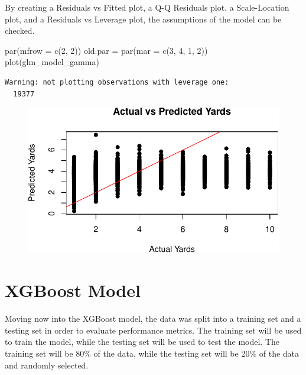 \documentclass[
  super,
  preprint,
  3p]{elsarticle}
\newenvironment{Shaded}{\begin{snugshade}}{\end{snugshade}}
\newcommand{\AttributeTok}[1]{\textcolor[rgb]{0.40,0.45,0.13}{#1}}
\newcommand{\DecValTok}[1]{\textcolor[rgb]{0.68,0.00,0.00}{#1}}
\newcommand{\FunctionTok}[1]{\textcolor[rgb]{0.28,0.35,0.67}{#1}}
\newcommand{\NormalTok}[1]{\textcolor[rgb]{0.00,0.23,0.31}{#1}}
\newcommand{\OtherTok}[1]{\textcolor[rgb]{0.00,0.23,0.31}{#1}}
\begin{document}
By creating a Residuals vs Fitted plot, a Q-Q Residuals plot, a
Scale-Location plot, and a Residuals vs Leverage plot, the assumptions
of the model can be checked.

\begin{Shaded}
\begin{Highlighting}[]
\FunctionTok{par}\NormalTok{(}\AttributeTok{mfrow =} \FunctionTok{c}\NormalTok{(}\DecValTok{2}\NormalTok{, }\DecValTok{2}\NormalTok{))}
\NormalTok{old.par }\OtherTok{=} \FunctionTok{par}\NormalTok{(}\AttributeTok{mar =} \FunctionTok{c}\NormalTok{(}\DecValTok{3}\NormalTok{, }\DecValTok{4}\NormalTok{, }\DecValTok{1}\NormalTok{, }\DecValTok{2}\NormalTok{))}
\FunctionTok{plot}\NormalTok{(glm\_model\_gamma)}
\end{Highlighting}
\end{Shaded}

\begin{verbatim}
Warning: not plotting observations with leverage one:
  19377
\end{verbatim}

\begin{figure}[H]

{\centering \includegraphics{project_report_files/figure-pdf/unnamed-chunk-19-1.pdf}

}

\end{figure}

\hypertarget{xgboost-model}{%
\section{XGBoost Model}\label{xgboost-model}}

Moving now into the XGBoost model, the data was split into a training
set and a testing set in order to evaluate performance metrics. The
training set will be used to train the model, while the testing set will
be used to test the model. The training set will be 80\% of the data,
while the testing set will be 20\% of the data and randomly selected.
\end{document}
